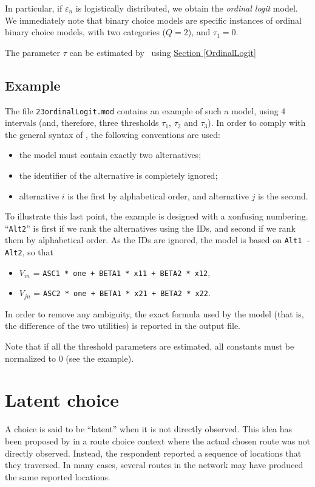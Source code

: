 \documentclass[12pt]{memoir}
\begin{document}
In particular, if $\varepsilon_n$ is logistically distributed, we obtain the \emph{ordinal logit} model. 
We immediately note that binary choice models are specific instances
of ordinal binary choice models, with two categories ($Q=2$), and $\tau_1=0$.

The parameter $\tau$ can be estimated by \BIOGEME\ using \hyperlink{OrdinalLogit}{Section [OrdinalLogit]}

\subsection*{Example}

The file \texttt{23ordinalLogit.mod} contains an example of such a model, using 4 intervals (and, therefore, three thresholds $\tau_1$, $\tau_2$ and $\tau_3$). In order to comply with the general syntax of \BIOGEME, the following conventions are used:
\begin{itemize}
\item the model must contain exactly two alternatives;
\item the identifier of the alternative is completely ignored;
\item alternative $i$ is the first by alphabetical order, and alternative $j$ is the second.
\end{itemize}
To illustrate this last point, the example is designed with a xonfusing numbering. ``\texttt{Alt2}'' is first if we rank the alternatives using the IDs, and second if we rank them by alphabetical order. As the IDs are ignored, the model is based on \texttt{Alt1 - Alt2}, so that
\begin{itemize}
\item $V_{in}$ = \texttt{ASC1 * one + BETA1 * x11 + BETA2 * x12},
\item $V_{jn}$ = \texttt{ASC2 * one + BETA1 * x21 + BETA2 * x22}.
\end{itemize}

In order to remove any ambiguity, the exact formula used by the model (that is, the difference of the two utilities)  is reported in the output file.

Note that if all the threshold parameters are estimated, all constants must be normalized to 0 (see the example). 




\section{Latent choice}
\label{sec:latentChoice}
A choice is said to be ``latent'' when it is not directly observed.
This idea has been proposed by  in a route
choice context where the actual chosen route was not directly
observed. Instead, the respondent reported a sequence of locations
that they traversed. In many cases, several  routes in the
network may have produced the same reported locations. 
\end{document}
